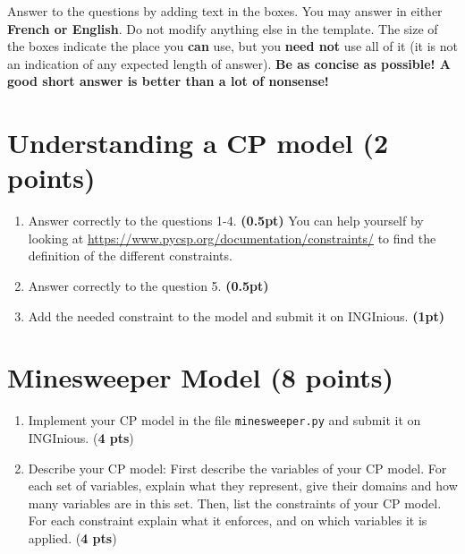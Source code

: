 \documentclass[11pt,a4paper]{report}
\begin{document}
\maketitle

Answer to the questions by adding text in the boxes. 
You may answer in either \textbf{French or English}. 
Do not modify anything else in the template.  
The size of the boxes indicate the place you \textbf{can} use, but you \textbf{need not} use all of it (it is not an indication of any expected length of answer). 
\textbf{Be as concise as possible! A good short answer is better than a lot of nonsense!}

\section{Understanding a CP model (2 points)}

\begin{enumerate}
    \item Answer correctly to the questions 1-4. \textbf{(0.5pt)}
    You can help yourself by looking
    at \url{https://www.pycsp.org/documentation/constraints/} to find the definition of the different constraints.
    \item Answer correctly to the question 5. \textbf{(0.5pt)}
    \item Add the needed constraint to the model and submit it on INGInious. \textbf{(1pt)}
\end{enumerate}

\newpage
\section{Minesweeper Model (8 points)}

\begin{enumerate}
    \item Implement your CP model in the file \texttt{minesweeper.py} and submit it on INGInious. (\textbf{4 pts})
    \item Describe your CP model: First describe the variables of your CP model. 
    For each set of variables, explain what they represent, give their domains and how many variables are in this set. 
    Then, list the constraints of your CP model. 
    For each constraint explain what it enforces, and on which variables it is applied. (\textbf{4 pts})
\end{enumerate}
\end{document}
